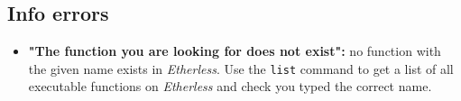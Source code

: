   \subsection{Info errors}
  \begin{itemize}
    \item \textbf{"The function you are looking for does not exist":} no function with the given name exists in \textit{Etherless}. Use the \texttt{list} command to get a list of all executable functions on \textit{Etherless} and check you typed the correct name.
  \end{itemize}
